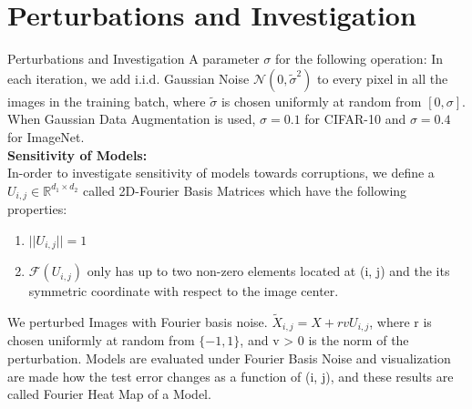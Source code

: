 \documentclass[8pt]{beamer}
\begin{document}
\section{Perturbations and Investigation}
\begin{frame}{Perturbations and Investigation}
\qquad A parameter $\sigma$ for the following operation: In each iteration, we add i.i.d. Gaussian Noise $\mathcal{N}(0,\tilde{\sigma}^2)$ to every pixel in all the images in the training batch, where $\tilde{\sigma}$ is chosen uniformly at random from $[0, \sigma]$.  When Gaussian Data Augmentation is used, $\sigma = 0.1$ for CIFAR-10 and $\sigma = 0.4$ for ImageNet.\\
\vspace{0.1in}
\textbf{Sensitivity of Models:}\\
In-order to investigate sensitivity of models towards corruptions, we define a $U_{i,j} \in \mathbb{R}^{d_1 \times d_2}$ called 2D-Fourier Basis Matrices which have the following properties:\\
\begin{enumerate}
    \item $||U_{i,j}|| = 1$
    \item $\mathcal{F}(U_{i,j})$ only has up to two non-zero elements located at (i, j) and the its symmetric coordinate with respect to the image center.
\end{enumerate}

We perturbed Images with Fourier basis noise. $\tilde{X}_{i,j} = X + rvU_{i,j}$, where r is chosen uniformly at random from $\{-1, 1\}$, and v > 0 is the norm of the perturbation. Models are evaluated under Fourier Basis Noise and visualization are made how the test error changes as a function of (i, j), and these results are called Fourier Heat Map of a Model.
\end{frame}
\end{document}
